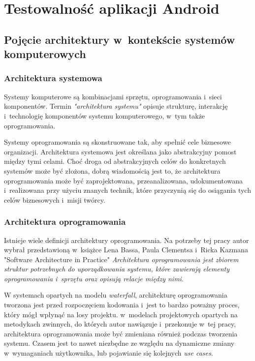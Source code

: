 \chapter{Testowalność aplikacji Android}
\label{opis_problemu}

\section{Pojęcie architektury w~kontekście systemów \newline komputerowych}
\subsection{Architektura systemowa}
Systemy komputerowe są kombinacjami sprzętu, oprogramowania i~sieci komponentów. Termin \textit{"architektura systemu"} opisuje strukturę, interakcję i~technologię komponentów systemu komputerowego, w~tym także oprogramowania.

Systemy oprogramowania są skonstruowane tak, aby spełnić cele biznesowe organizacji. Architektura systemowa jest określana jako abstrakcyjny pomost między tymi celami. Choć droga od abstrakcyjnych celów do konkretnych systemów może być złożona, dobrą wiadomością jest to, że architektura oprogramowania może być zaprojektowana, przeanalizowana, udokumentowana i~realizowana przy użyciu znanych technik, które przyczynią się do osiągania tych celów biznesowych i~misji twórcy. 


\subsection{Architektura oprogramowania}
Istnieje wiele definicji architektury oprogramowania. Na potrzeby tej pracy autor wybrał przedstawioną w~książce Lena Bassa, Paula Clementsa i~Ricka Kazmana "Software Architecture in Practice"\cite{bib:architect:software} \textit{Architektura oprogramowania jest zbiorem struktur potrzebnych do uporządkowania systemu, które zawierają elementy oprogramowania i~sprzętu oraz opisują relacje między nimi}. 

W systemach opartych na modelu \textit{waterfall}, architekturę oprogramowania tworzona jest przed rozpoczęciem kodowania i~jest to bardzo poważny proces, który mógł wpłynąć na losy projektu. w~modelach projektowych opartych na metodykach zwinnych, do których autor nawiązuje i~przekonuje w~tej pracy, architektura oprogramowania może być zmieniana również podczas tworzenia systemu. Czasem jest to nawet niezbędne ze względu na dynamiczne zmiany w~wymaganiach użytkownika, lub pojawianie się kolejnych \textit{use cases}.

